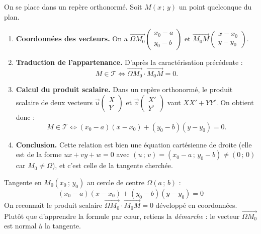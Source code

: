 \documentclass[11pt]{article}
\begin{document}
\begin{experience}
On se place dans un repère orthonormé. Soit $M(x\,;\,y)$ un point quelconque du plan.
\begin{enumerate}
\item \textbf{Coordonnées des vecteurs.} On a $\overrightarrow{\Omega M_0}\begin{pmatrix} x_0 - a \\ y_0 - b \end{pmatrix}$ et $\overrightarrow{M_0 M}\begin{pmatrix} x - x_0 \\ y - y_0 \end{pmatrix}$.
\item \textbf{Traduction de l'appartenance.} D'après la caractérisation précédente :
\[ M \in \mathcal{T} \iff \overrightarrow{\Omega M_0} \cdot \overrightarrow{M_0 M} = 0. \]
\item \textbf{Calcul du produit scalaire.} Dans un repère orthonormé, le produit scalaire de deux vecteurs $\vec{u}\begin{pmatrix} X \\ Y \end{pmatrix}$ et $\vec{v}\begin{pmatrix} X' \\ Y' \end{pmatrix}$ vaut $XX' + YY'$. On obtient donc :
\[ M \in \mathcal{T} \iff (x_0 - a)(x - x_0) + (y_0 - b)(y - y_0) = 0. \]
\item \textbf{Conclusion.} Cette relation est bien une équation cartésienne de droite (elle est de la forme $ux + vy + w = 0$ avec $(u\,;\,v) = (x_0 - a\,;\,y_0 - b) \neq (0\,;\,0)$ car $M_0 \neq \Omega$), et c'est celle de la tangente cherchée.
\end{enumerate}
\end{experience}

\begin{aretenir}
Tangente en $M_0(x_0\,;\,y_0)$ au cercle de centre $\Omega(a\,;\,b)$ :
\[ \boxed{(x_0 - a)(x - x_0) + (y_0 - b)(y - y_0) = 0} \]
On reconnaît le produit scalaire $\overrightarrow{\Omega M_0}\cdot\overrightarrow{M_0 M} = 0$ développé en coordonnées. Plutôt que d'apprendre la formule par cœur, retiens la \emph{démarche} : le vecteur $\overrightarrow{\Omega M_0}$ est normal à la tangente.
\end{aretenir}
\end{document}
